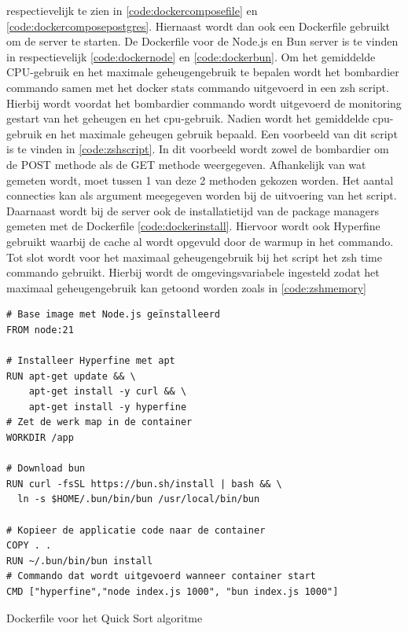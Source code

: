 respectievelijk te zien in \ref{code:dockercomposefile} en \ref{code:dockercomposepostgres}.
Hiernaast wordt dan ook een Dockerfile gebruikt om de server te starten. De Dockerfile voor de Node.js en Bun server is te vinden in
respectievelijk \ref{code:dockernode} en \ref{code:dockerbun}. 
Om het gemiddelde CPU-gebruik en het maximale geheugengebruik te bepalen wordt het bombardier commando samen met het docker stats commando uitgevoerd in een zsh script.
Hierbij wordt voordat het bombardier commando wordt uitgevoerd de monitoring gestart van het geheugen en het cpu-gebruik. Nadien wordt het gemiddelde cpu-gebruik en het maximale geheugen gebruik bepaald.
Een voorbeeld van dit script  is te vinden in \ref{code:zshscript}. 
In dit voorbeeld wordt zowel de bombardier om de POST methode als de GET methode weergegeven. Afhankelijk van wat gemeten wordt, moet tussen 1 van deze 2 methoden gekozen worden.
Het aantal connecties kan als argument meegegeven worden bij de uitvoering van het script.
Daarnaast wordt bij de server ook de installatietijd van de package managers gemeten met de Dockerfile \ref{code:dockerinstall}.
Hiervoor wordt ook Hyperfine gebruikt waarbij de cache al wordt opgevuld door de warmup in het commando.
Tot slot wordt voor het maximaal geheugengebruik bij het script het zsh time commando gebruikt. Hierbij wordt de omgevingsvariabele 
ingesteld zodat het maximaal geheugengebruik kan getoond worden zoals in \ref{code:zshmemory}
\begin{listing}[H]
  \centering
  \begin{verbatim}
# Base image met Node.js geïnstalleerd
FROM node:21

# Installeer Hyperfine met apt
RUN apt-get update && \
    apt-get install -y curl && \
    apt-get install -y hyperfine
# Zet de werk map in de container
WORKDIR /app

# Download bun
RUN curl -fsSL https://bun.sh/install | bash && \
  ln -s $HOME/.bun/bin/bun /usr/local/bin/bun

# Kopieer de applicatie code naar de container
COPY . .
RUN ~/.bun/bin/bun install
# Commando dat wordt uitgevoerd wanneer container start
CMD ["hyperfine","node index.js 1000", "bun index.js 1000"]
      \end{verbatim}
      \caption{\label{code:dockerscript}Dockerfile voor het Quick Sort algoritme}
\end{listing}

